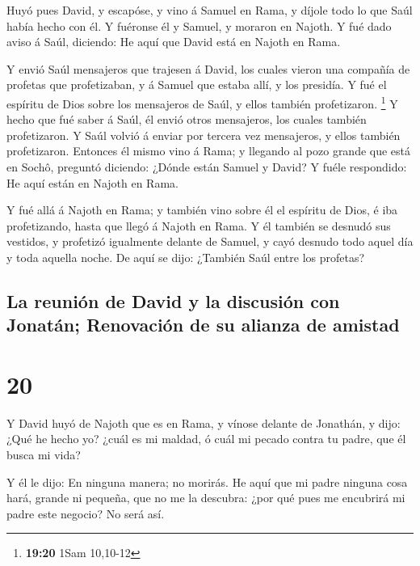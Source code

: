  Huyó pues David, y escapóse, y vino á Samuel en Rama, y
díjole todo lo que Saúl había hecho con él. Y fuéronse él y Samuel, y
moraron en Najoth.  Y fué dado aviso á Saúl, diciendo: He
aquí que David está en Najoth en Rama.

 Y envió Saúl mensajeros que trajesen á David, los cuales
vieron una compañía de profetas que profetizaban, y á Samuel que estaba
allí, y los presidía. Y fué el espíritu de Dios sobre los mensajeros de
Saúl, y ellos también profetizaron. \footnote{\textbf{19:20} 1Sam
  10,10-12}  Y hecho que fué saber á Saúl, él envió otros
mensajeros, los cuales también profetizaron. Y Saúl volvió á enviar por
tercera vez mensajeros, y ellos también profetizaron. 
Entonces él mismo vino á Rama; y llegando al pozo grande que está en
Sochô, preguntó diciendo: ¿Dónde están Samuel y David? Y fuéle
respondido: He aquí están en Najoth en Rama.

 Y fué allá á Najoth en Rama; y también vino sobre él el
espíritu de Dios, é iba profetizando, hasta que llegó á Najoth en Rama.
 Y él también se desnudó sus vestidos, y profetizó
igualmente delante de Samuel, y cayó desnudo todo aquel día y toda
aquella noche. De aquí se dijo: ¿También Saúl entre los profetas?

\hypertarget{la-reuniuxf3n-de-david-y-la-discusiuxf3n-con-jonatuxe1n-renovaciuxf3n-de-su-alianza-de-amistad}{%
\subsection{La reunión de David y la discusión con Jonatán; Renovación
de su alianza de
amistad}\label{la-reuniuxf3n-de-david-y-la-discusiuxf3n-con-jonatuxe1n-renovaciuxf3n-de-su-alianza-de-amistad}}

\hypertarget{section-19}{%
\section{20}\label{section-19}}

 Y David huyó de Najoth que es en Rama, y vínose delante
de Jonathán, y dijo: ¿Qué he hecho yo? ¿cuál es mi maldad, ó cuál mi
pecado contra tu padre, que él busca mi vida?

 Y él le dijo: En ninguna manera; no morirás. He aquí que
mi padre ninguna cosa hará, grande ni pequeña, que no me la descubra:
¿por qué pues me encubrirá mi padre este negocio? No será así.

